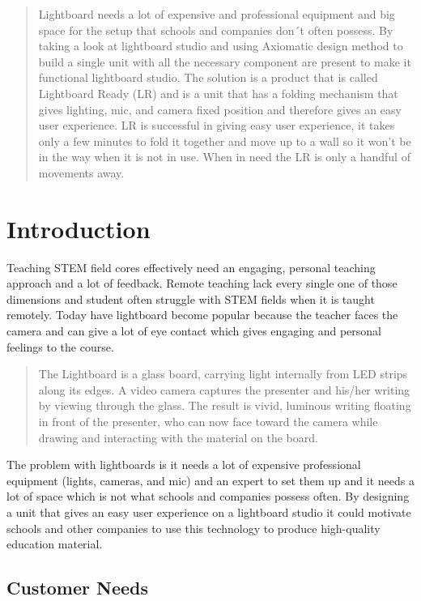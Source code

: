 \documentclass[a4paper]{jpconf}
\begin{document}
\begin{abstract}
Lightboard needs a lot of expensive and professional equipment and big space for the setup that schools and companies don´t often possess.
By taking a look at lightboard studio and using Axiomatic design method to build a single unit with all the necessary component are present to make it functional lightboard studio.
The solution is a product that is called Lightboard Ready (LR) and is a unit that has a folding mechanism that gives lighting, mic, and camera fixed position and therefore gives an easy user experience.
LR is successful in giving easy user experience, it takes only a few minutes to fold it together and move up to a wall so it won't be in the way when it is not in use. When in need the LR is only a handful of movements away.
\end{abstract}



\section{Introduction}
Teaching STEM field cores effectively need an engaging, personal teaching approach and a lot of feedback. Remote teaching lack every single one of those dimensions and student often struggle with STEM fields when it is taught remotely. Today have lightboard become popular because the teacher faces the camera and can give a lot of eye contact which gives engaging and personal feelings to the course. 
\begin{quote}
	The Lightboard is a glass board, carrying light internally from LED strips along its edges. A video camera captures the presenter and his/her writing by viewing through the glass. The result is vivid, luminous writing floating in front of the presenter, who can now face toward the camera while drawing and interacting with the material on the board.\cite{birdwell2015capturing}
\end{quote}
The problem with lightboards is it needs a lot of expensive professional equipment (lights, cameras, and mic) and an expert to set them up and it needs a lot of space which is not what schools and companies possess often. 
By designing a unit that gives an easy user experience on a lightboard studio it could motivate schools and other companies to use this technology to produce high-quality education material.

\subsection{Customer Needs}\label{CN}
\end{document}
